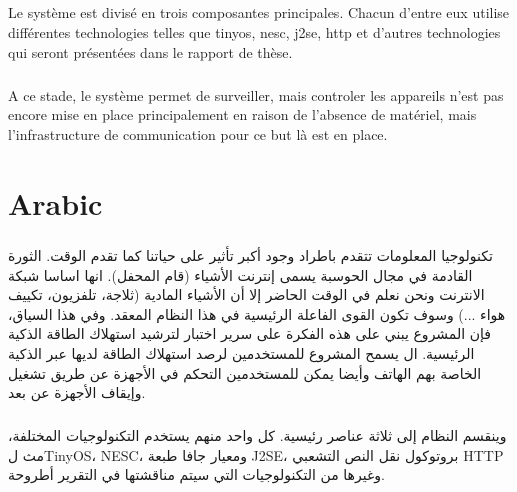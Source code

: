 \documentclass[oneside,12pt,a4paper,final]{book}
\begin{document}
\paragraph {}
Le système est divisé en trois composantes principales. Chacun d'entre eux  utilise différentes technologies telles que \gls{tinyos}, \gls{nesc}, \gls{j2se}, \gls{http} et d'autres technologies qui seront présentées dans le rapport de thèse.
\paragraph{}
A ce stade, le système permet de surveiller, mais controler les appareils n'est pas encore mise en place principalement en raison de l'absence de matériel, mais l'infrastructure de communication pour ce but là est en place.


\chapter{Arabic}
\paragraph{}
\begin{arabtex}
تكنولوجيا المعلومات تتقدم باطراد وجود أكبر تأثير على حياتنا كما تقدم الوقت. الثورة القادمة في مجال الحوسبة يسمى إنترنت الأشياء (قام المحفل). انها اساسا شبكة الانترنت ونحن نعلم في الوقت الحاضر إلا أن الأشياء المادية (ثلاجة، تلفزيون، تكييف هواء ...) وسوف تكون القوى الفاعلة الرئيسية في هذا النظام المعقد. وفي هذا السياق، فإن المشروع يبني على هذه الفكرة على سرير اختبار لترشيد استهلاك الطاقة الذكية الرئيسية. ال يسمح المشروع للمستخدمين لرصد استهلاك الطاقة لديها عبر الذكية الخاصة بهم الهاتف وأيضا يمكن للمستخدمين التحكم في الأجهزة عن طريق تشغيل وإيقاف الأجهزة عن بعد.
\end{arabtex}
\paragraph{}
\begin{arabtex}
وينقسم النظام إلى ثلاثة عناصر رئيسية. كل واحد منهم يستخدم
التكنولوجيات المختلفة، مث لTinyOS، NESC، ومعيار جافا
طبعة J2SE، بروتوكول نقل النص التشعبي HTTP وغيرها من التكنولوجيات
التي سيتم مناقشتها في التقرير أطروحة.
\end{arabtex}
\end{document}
